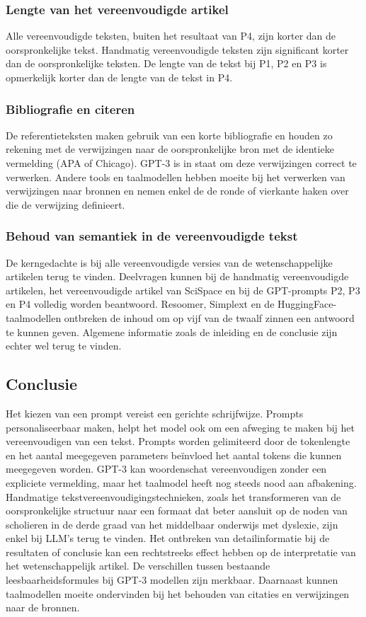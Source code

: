 \subsubsection{Lengte van het vereenvoudigde artikel}
Alle vereenvoudigde teksten, buiten het resultaat van P4, zijn korter dan de oorspronkelijke tekst. Handmatig vereenvoudigde teksten zijn significant korter dan de oorspronkelijke teksten. De lengte van de tekst bij P1, P2 en P3 is opmerkelijk korter dan de lengte van de tekst in P4.

\subsubsection{Bibliografie en citeren}
De referentieteksten maken gebruik van een korte bibliografie en houden zo rekening met de verwijzingen naar de oorspronkelijke bron met de identieke vermelding (APA of Chicago). GPT-3 is in staat om deze verwijzingen correct te verwerken. Andere tools en taalmodellen hebben moeite bij het verwerken van verwijzingen naar bronnen en nemen enkel de de ronde of vierkante haken over die de verwijzing definieert.

\subsubsection{Behoud van semantiek in de vereenvoudigde tekst}
De kerngedachte is bij alle vereenvoudigde versies van de wetenschappelijke artikelen terug te vinden. Deelvragen kunnen bij de handmatig vereenvoudigde artikelen, het vereenvoudigde artikel van SciSpace en bij de GPT-prompts P2, P3 en P4 volledig worden beantwoord. Resoomer, Simplext en de HuggingFace-taalmodellen ontbreken de inhoud om op vijf van de twaalf zinnen een antwoord te kunnen geven. Algemene informatie zoals de inleiding en de conclusie zijn echter wel terug te vinden.

\subsection{Conclusie}

Het kiezen van een prompt vereist een gerichte schrijfwijze. Prompts personaliseerbaar maken, helpt het model ook om een afweging te maken bij het vereenvoudigen van een tekst. Prompts worden gelimiteerd door de tokenlengte en het aantal meegegeven parameters beïnvloed het aantal tokens die kunnen meegegeven worden. GPT-3 kan woordenschat vereenvoudigen zonder een expliciete vermelding, maar het taalmodel heeft nog steeds nood aan afbakening. Handmatige tekstvereenvoudigingstechnieken, zoals het transformeren van de oorspronkelijke structuur naar een formaat dat beter aansluit op de noden van scholieren in de derde graad van het middelbaar onderwijs met dyslexie, zijn enkel bij LLM's terug te vinden. Het ontbreken van detailinformatie bij de resultaten of conclusie kan een rechtstreeks effect hebben op de interpretatie van het wetenschappelijk artikel. De verschillen tussen bestaande leesbaarheidsformules bij GPT-3 modellen zijn merkbaar. Daarnaast kunnen taalmodellen moeite ondervinden bij het behouden van citaties en verwijzingen naar de bronnen. 

